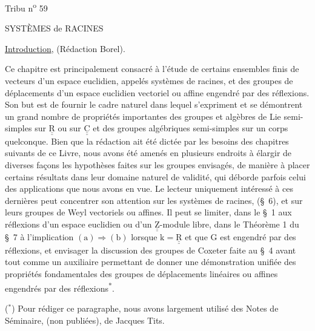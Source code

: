 \hfill Tribu n\textsuperscript{o} 59

\begin{center}
SYSTÈMES de RACINES

\uline{Introduction}, (Rédaction Borel).
\end{center}

Ce chapitre est principalement consacré à l'étude de certains ensembles finis de vecteurs d'un espace euclidien, appelés systèmes de racines, et des groupes de déplacements d'un espace euclidien vectoriel ou affine engendré par des réflexions. Son but est de fournir le cadre naturel dans lequel s'expriment et se démontrent un grand nombre de propriétés importantes des groupes et algèbres de Lie semi-simples sur $\underline{\underline{\mathrm R}}$ ou sur $\underline{\underline{\mathrm C}}$ et des groupes algébriques semi-simples sur un corps quelconque. Bien que la rédaction ait été dictée par les besoins des chapitres suivants de ce Livre, nous avons été amenés en plusieurs endroits à élargir de diverses façons les hypothèses faites sur les groupes envisagés, de manière à placer certains résultats dans leur domaine naturel de validité, qui déborde parfois celui des applications que nous avons en vue. Le lecteur uniquement intéressé à ces dernières peut concentrer son attention sur les systèmes de racines, (\S~6), et sur leurs groupes de Weyl vectoriels ou affines. Il peut se limiter, dans le \S~1 aux réflexions d'un espace euclidien ou d'un $\underline{\underline{\mathrm Z}}$-module libre, dans le Théorème 1 du \S~7 à l'implication $\mathrm{(a)}\Longrightarrow\mathrm{(b)}$ lorsque $\mathrm k=\underline{\underline{\mathrm R}}$ et que $\mathrm G$ est engendré par des réflexions, et envisager la discussion des groupes de Coxeter faite au \S~4 avant tout comme un auxiliaire permettant de donner une démonstration unifiée des propriétés fondamentales des groupes de déplacements linéaires ou affines engendrés par des réflexions\textsuperscript{*}.

\noindent\makebox[\linewidth][s]{- - - - - - - - - - - - - - - - - - - - - - - - - - - - - - - - - - - - - - - - -}

($^{*}$) Pour rédiger ce paragraphe, nous avons largement utilisé des Notes de Séminaire, (non publiées), de Jacques Tits.

